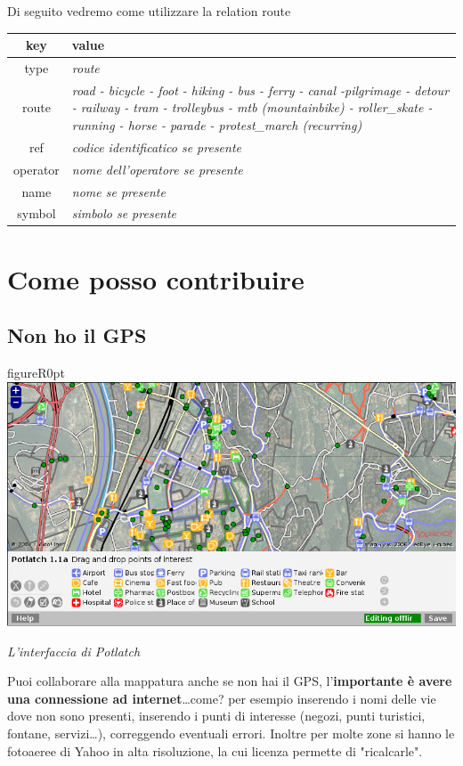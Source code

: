 \documentclass[a4paper,twoside,12pt,]{article}
\newcommand{\gps}{GPS\xspace}
\begin{document}
Di seguito vedremo come utilizzare la relation route
\begin{center}
 \begin{tabular}{cp{9cm}}
  \toprule
   \textbf{key} & \textbf{value} \\
  \midrule
   type & \textit{route} \\
   route & \textit{road - bicycle - foot - hiking - bus - ferry - canal -pilgrimage - detour - railway - tram - trolleybus - mtb (mountainbike) - roller\_skate - running - horse - parade - protest\_march (recurring)} \\
   ref & \textit{codice identificatico se presente}\\
   operator & \textit{nome dell'operatore se presente} \\
   name & \textit{nome se presente} \\
   symbol & \textit{simbolo se presente} \\
  \bottomrule
\end{tabular}

\end{center}

\section{Come posso contribuire}
\subsection{Non ho il \gps}
\begin{wrapfloat}{figure}{R}{0pt}
 \includegraphics[width=0.7\columnwidth]{potlatch.png}
 \caption{\textit{L'interfaccia di Potlatch}}
\end{wrapfloat}
Puoi collaborare alla mappatura anche se non hai il \gps, l'\textbf{importante è avere una connessione ad internet}\dots come? per esempio inserendo i nomi delle vie dove non sono presenti, inserendo i punti di interesse (negozi, punti turistici, fontane, servizi\dots), correggendo eventuali errori. Inoltre per molte zone si hanno le fotoaeree di Yahoo in alta risoluzione, la cui licenza permette di "ricalcarle".
\end{document}
